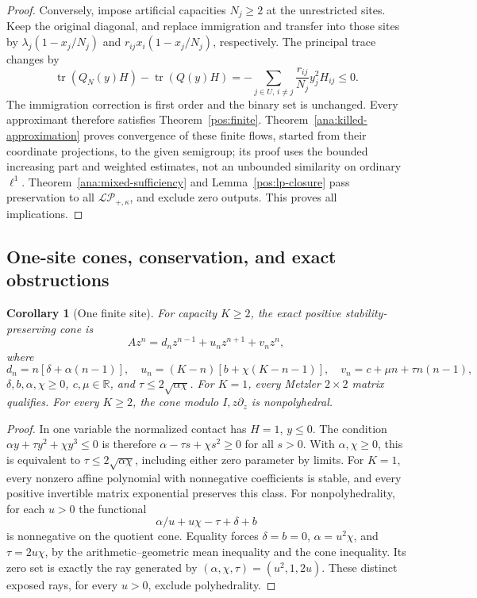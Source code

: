 \documentclass[reqno]{amsart}
\newtheorem{corollary}[theorem]{Corollary}
\theoremstyle{definition}
\theoremstyle{remark}
\newcommand{\R}{\mathbb R}
\begin{document}
\begin{proof}
Conversely, impose artificial capacities \(N_j\ge2\) at the unrestricted sites.
Keep the original diagonal, and replace immigration and transfer into those
sites by
\(\lambda_j(1-x_j/N_j)\) and
\(r_{ij}x_i(1-x_j/N_j)\), respectively.
The principal trace changes by
\[
 \operatorname{tr}(Q_N(y)H)-\operatorname{tr}(Q(y)H)
 =-\sum_{j\in U,\,i\ne j}\frac{r_{ij}}{N_j}y_j^2H_{ij}\le0.
\]
The immigration correction is first order and the binary set is unchanged.
Every approximant therefore satisfies Theorem~\ref{pos:finite}.
Theorem~\ref{ana:killed-approximation} proves convergence of these finite flows,
started from their coordinate projections, to the given semigroup; its proof
uses the bounded increasing part and weighted estimates, not an unbounded
similarity on ordinary \(\ell^1\).
Theorem~\ref{ana:mixed-sufficiency} and Lemma~\ref{pos:lp-closure} pass preservation
to all \(\mathcal{LP}_{+,\kappa}\), and exclude zero outputs.
This proves all implications.
\end{proof}

\subsection{One-site cones, conservation, and exact obstructions}

\begin{corollary}[One finite site]\label{pos:one-site}
For capacity \(K\ge2\), the exact positive stability-preserving cone is
\[
 Az^n=d_nz^{n-1}+u_nz^{n+1}+v_nz^n,
\]
where
\[
 d_n=n[\delta+\alpha(n-1)],\quad
 u_n=(K-n)[b+\chi(K-n-1)],\quad
 v_n=c+\mu n+\tau n(n-1),
\]
\(\delta,b,\alpha,\chi\ge0\), \(c,\mu\in\R\), and
\(\tau\le2\sqrt{\alpha\chi}\).
For \(K=1\), every Metzler \(2\times2\) matrix qualifies.
For every \(K\ge2\), the cone modulo \(I,z\partial_z\) is nonpolyhedral.
\end{corollary}
\begin{proof}
In one variable the normalized contact has \(H=1\), \(y\le0\).
The condition \(\alpha y+\tau y^2+\chi y^3\le0\) is therefore
\(\alpha-\tau s+\chi s^2\ge0\) for all \(s>0\).
With \(\alpha,\chi\ge0\), this is equivalent to
\(\tau\le2\sqrt{\alpha\chi}\), including either zero parameter by limits.
For \(K=1\), every nonzero affine polynomial with nonnegative coefficients is
stable, and every positive invertible matrix exponential preserves this class.
For nonpolyhedrality, for each \(u>0\) the functional
\[
 \alpha/u+u\chi-\tau+\delta+b
\]
is nonnegative on the quotient cone.  Equality forces \(\delta=b=0\),
\(\alpha=u^2\chi\), and \(\tau=2u\chi\), by the arithmetic--geometric mean
inequality and the cone inequality.  Its zero set is exactly the ray generated
by \((\alpha,\chi,\tau)=(u^2,1,2u)\).
These distinct exposed rays, for every \(u>0\), exclude polyhedrality.
\end{proof}
\end{document}
